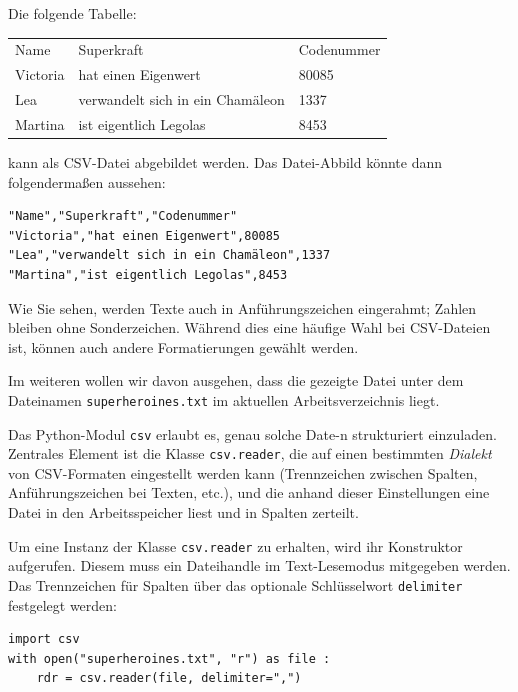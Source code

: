 \begin{tcolorbox}[title=Beispiel CSV-Dateien]
Die folgende Tabelle:

\begin{tabular}{lll}
	Name     & Superkraft                       & Codenummer \\
	Victoria & hat einen Eigenwert              & 80085 \\
	Lea      & verwandelt sich in ein Chamäleon & 1337 \\
	Martina  & ist eigentlich Legolas           & 8453
\end{tabular}

\vspace{6pt}
kann als CSV-Datei abgebildet werden. Das Datei-Abbild könnte dann folgendermaßen aussehen:
\begin{cmdbox}
\begin{verbatim}
"Name","Superkraft","Codenummer"
"Victoria","hat einen Eigenwert",80085
"Lea","verwandelt sich in ein Chamäleon",1337
"Martina","ist eigentlich Legolas",8453
\end{verbatim}
\end{cmdbox}

Wie Sie sehen, werden Texte auch in Anführungszeichen eingerahmt; Zahlen bleiben ohne Sonderzeichen. Während dies eine häufige Wahl bei CSV-Dateien ist, können auch andere Formatierungen gewählt werden.

Im weiteren wollen wir davon ausgehen, dass die gezeigte Datei unter dem Dateinamen \texttt{superheroines.txt} im aktuellen Arbeitsverzeichnis liegt.
\end{tcolorbox}

Das Python-Modul \texttt{csv} erlaubt es, genau solche Date-n strukturiert einzuladen. Zentrales Element ist die Klasse \texttt{csv.reader}, die auf einen bestimmten \emph{Dialekt} von CSV-Formaten eingestellt werden kann (\eg Trennzeichen zwischen Spalten, Anführungszeichen bei Texten, etc.), und die anhand dieser Einstellungen eine Datei in den Arbeitsspeicher liest und in Spalten zerteilt.

Um eine Instanz der Klasse \texttt{csv.reader} zu erhalten, wird ihr Konstruktor aufgerufen. Diesem muss ein Dateihandle im Text-Lesemodus mitgegeben werden. Das Trennzeichen für Spalten über das optionale Schlüsselwort \texttt{delimiter} festgelegt werden:

\begin{codebox}
\begin{verbatim}
import csv
with open("superheroines.txt", "r") as file :
    rdr = csv.reader(file, delimiter=",")
\end{verbatim}
\end{codebox}

